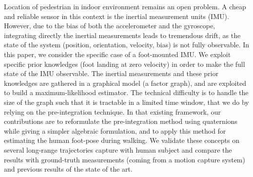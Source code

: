 %
%
Location of pedestrian in indoor environment remains an open problem.
A cheap and reliable sensor in this context is the inertial measurement units (IMU).
However, due to the bias of both the accelerometer and the gyroscope, integrating directly the inertial measurements leads to tremendous drift, as the state of the system (position, orientation, velocity, bias) is not fully observable. 
In this paper, we consider the specific case of a foot-mounted IMU.
We exploit specific prior knowledges (foot landing at zero velocity) in order to make the full state of the IMU observable.
The inertial measurements and these prior knowledges are gathered in a graphical model (a factor graph), and are exploited to build a maximum-likelihood estimator.
The technical difficulty is to handle the size of the graph such that it is tractable in a limited time window, that we do by relying on the pre-integration technique.
In that existing framework, our contributions are to reformulate the pre-integration method using quaternions while giving a simpler algebraic formulation, and to apply this method for estimating the human foot-pose during walking.
We validate these concepts on several long-range trajectories capture with human subject and compare the results with ground-truth measurements (coming from a motion capture system) and previous results of the state of the art.



